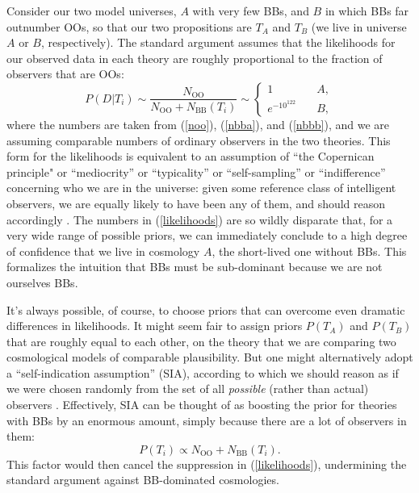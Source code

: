 \documentclass[12pt,letterpaper]{article}
\newcommand{\be}{\begin{equation}}
\newcommand{\ee}{\end{equation}}
\newcommand{\OO}{{\mathrm{OO}}}
\newcommand{\BB}{{\mathrm{BB}}}
\begin{document}
Consider our two model universes, $A$ with very few BBs, and $B$ in which BBs far outnumber OOs, so that our two propositions are $T_A$ and $T_B$ (we live in universe $A$ or $B$, respectively). 
The standard argument assumes that the likelihoods for our observed data in each theory are roughly proportional to the fraction of observers that are OOs:
\be
  P(D|T_i) \sim \frac{N_\OO}{N_\OO+N_\BB(T_i)} \sim 
  \begin{cases}
  1& \quad A, \\ 
  e^{-10^{122}}& \quad B,
  \end{cases}
  \label{likelihoods}
\ee
where the numbers are taken from (\ref{noo}), (\ref{nbba}), and (\ref{nbbb}), and we are assuming comparable numbers of ordinary observers in the two theories.
This form for the likelihoods is equivalent to an assumption of ``the Copernican principle" or ``mediocrity'' or ``typicality'' or ``self-sampling'' or ``indifference'' concerning who we are in the universe: given some reference class of intelligent observers, we are equally likely to have been any of them, and should reason accordingly \cite{gott93,Vilenkin:1994ua,bostrom,Olum:2000zw}.
The numbers in (\ref{likelihoods}) are so wildly disparate that, for a very wide range of possible priors, we can immediately conclude to a high degree of confidence that we live in cosmology $A$, the short-lived one without BBs.
This formalizes the intuition that BBs must be sub-dominant because we are not ourselves BBs.

It's always possible, of course, to choose priors that can overcome even dramatic differences in likelihoods.
It might seem fair to assign priors $P(T_A)$ and $P(T_B)$ that are roughly equal to each other, on the theory that we are comparing two cosmological models of comparable plausibility.
But one might alternatively adopt a ``self-indication assumption'' (SIA), according to which we should reason as if we were chosen randomly from the set of all \emph{possible} (rather than actual) observers \cite{bostrom,Olum:2000zw}. 
Effectively, SIA can be thought of as boosting the prior for theories with BBs by an enormous amount, simply because there are a lot of observers in them:
\be
  P(T_i) \propto N_\OO + N_\BB(T_i).
\ee
This factor would then cancel the suppression in (\ref{likelihoods}), undermining the standard argument against BB-dominated cosmologies.
\end{document}
